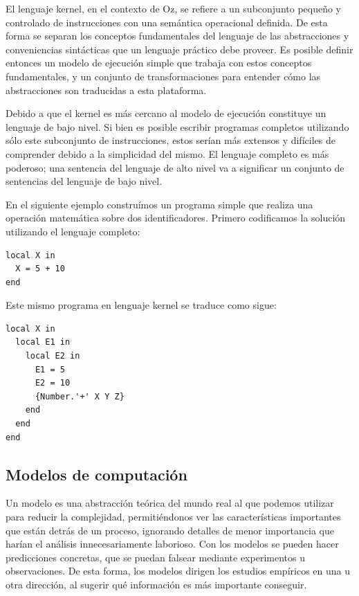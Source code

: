 \documentclass[a4paper,11pt]{article}
\begin{document}
El lenguaje kernel, en el contexto de Oz, se refiere a un subconjunto pequeño y controlado de instrucciones con una semántica operacional definida. De esta forma se separan los conceptos fundamentales del lenguaje de las abstracciones y conveniencias sintácticas que un lenguaje práctico debe proveer. Es posible definir entonces un modelo de ejecución simple que trabaja con estos conceptos fundamentales, y un conjunto de transformaciones para entender cómo las abstracciones son traducidas a esta plataforma.

Debido a que el kernel es más cercano al modelo de ejecución constituye un lenguaje de bajo nivel. Si bien es posible escribir programas completos utilizando sólo este subconjunto de instrucciones, estos serían más extensos y difíciles de comprender debido a la simplicidad del mismo. El lenguaje completo es más poderoso; una sentencia del lenguaje de alto nivel va a significar un conjunto de sentencias del lenguaje de bajo nivel.

En el siguiente ejemplo construímos un programa simple que realiza una operación matemática sobre dos identificadores. Primero codificamos la solución utilizando el lenguaje completo:

\begin{lstlisting}[language=oz]
local X in
  X = 5 + 10
end
\end{lstlisting}

Este mismo programa en lenguaje kernel se traduce como sigue:

\begin{lstlisting}[language=oz]
local X in
  local E1 in
    local E2 in
      E1 = 5
      E2 = 10
      {Number.'+' X Y Z}
    end
  end
end
\end{lstlisting}


\subsection{Modelos de computación}

Un modelo es una abstracción teórica del mundo real al que podemos utilizar para reducir la complejidad, permitiéndonos ver las características importantes que están detrás de un proceso, ignorando detalles de menor importancia que harían el análisis innecesariamente laborioso.
Con los modelos se pueden hacer predicciones concretas, que se puedan falsear mediante experimentos u observaciones. De esta forma, los modelos dirigen los estudios empíricos en una u otra dirección, al sugerir qué información es más importante conseguir.
\end{document}
